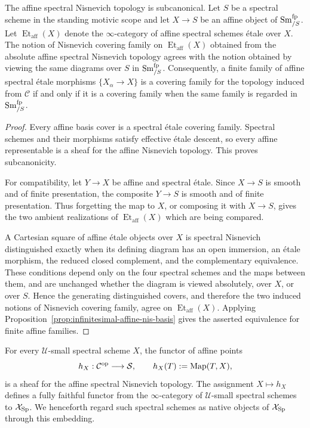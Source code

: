 \begin{proposition}
\label{prop:infinitesimal-big-nis}
The affine spectral Nisnevich topology is subcanonical.  Let $S$ be a spectral
scheme in the standing motivic scope and let $X\to S$ be an affine object of
$\operatorname{Sm}^{\mathrm{fp}}_{/S}$.  Let
$\operatorname{Et}_{\mathrm{aff}}(X)$ denote the $\infty$-category of affine
spectral schemes \'etale over $X$.  The notion of Nisnevich covering family
on $\operatorname{Et}_{\mathrm{aff}}(X)$ obtained from the absolute affine
spectral Nisnevich topology agrees with the notion obtained by viewing the
same diagrams over $S$ in $\operatorname{Sm}^{\mathrm{fp}}_{/S}$.  Consequently, a
finite family of affine spectral \'etale morphisms
$\{X_\alpha\to X\}$ is a covering family for the topology induced from
$\mathcal C$ if and only if it is a covering family when the same family is
regarded in $\operatorname{Sm}^{\mathrm{fp}}_{/S}$.
\end{proposition}

\begin{proof}
Every affine basis cover is a spectral \'etale covering family.  Spectral
schemes and their morphisms satisfy effective \'etale descent, so every
affine representable is a sheaf for the affine Nisnevich topology.  This
proves subcanonicity.

For compatibility, let $Y\to X$ be affine and spectral \'etale.  Since
$X\to S$ is smooth and of finite presentation, the composite $Y\to S$ is
smooth and of finite presentation.  Thus forgetting the map to $X$, or
composing it with $X\to S$, gives the two ambient realizations of
$\operatorname{Et}_{\mathrm{aff}}(X)$ which are being compared.

A Cartesian square of affine \'etale objects over $X$ is spectral Nisnevich
distinguished exactly when its defining diagram has an open immersion, an
\'etale morphism, the reduced closed complement, and the complementary
equivalence.  These conditions depend only on the four spectral schemes and
the maps between them, and are unchanged whether the diagram is viewed
absolutely, over $X$, or over $S$.  Hence the generating distinguished
covers, and therefore the two induced notions of Nisnevich covering family,
agree on $\operatorname{Et}_{\mathrm{aff}}(X)$.  Applying
Proposition~\ref{prop:infinitesimal-affine-nis-basis} gives the asserted
equivalence for finite affine families.
\end{proof}

\begin{proposition}
\label{prop:infinitesimal-native-yoneda}
For every $\mathcal U$-small spectral scheme $X$, the functor of affine points
\[
    h_X:\mathcal C^{\mathrm{op}}\longrightarrow\mathcal S,
    \qquad
    h_X(T):=\operatorname{Map}(T,X),
\]
is a sheaf for the affine spectral Nisnevich topology.  The assignment
$X\mapsto h_X$ defines a fully faithful functor from the $\infty$-category of
$\mathcal U$-small spectral schemes to $\mathcal X_{\mathrm{Sp}}$.  We henceforth regard
such spectral schemes as native objects of $\mathcal X_{\mathrm{Sp}}$ through this embedding.
\end{proposition}

